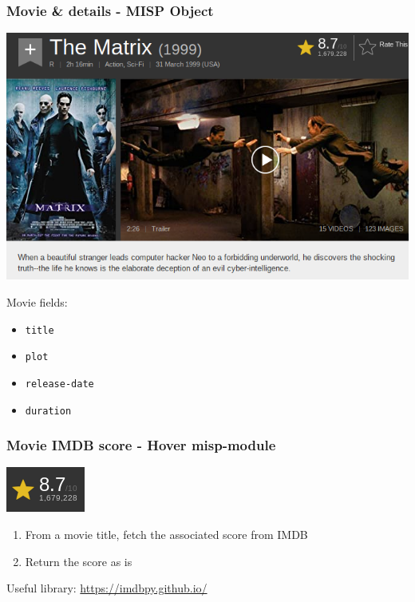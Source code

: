 \begin{frame}
    \frametitle{Movie \& details - MISP Object}
    \begin{center}
        \includegraphics[width=0.70\linewidth]{pics/movie-details}
    \end{center}
    Movie fields:
    \begin{itemize}
        \item \texttt{title}
        \item \texttt{plot}
        \item \texttt{release-date}
        \item \texttt{duration}
    \end{itemize}
\end{frame}

\begin{frame}
    \frametitle{Movie IMDB score - Hover misp-module}
    \begin{center}
        \includegraphics[width=0.3\linewidth]{pics/movie-score}
    \end{center}
    \begin{enumerate}
        \item From a movie title, fetch the associated score from IMDB
        \item Return the score as is
    \end{enumerate}
    \vspace{1em}
    Useful library: \url{https://imdbpy.github.io/}
\end{frame}

